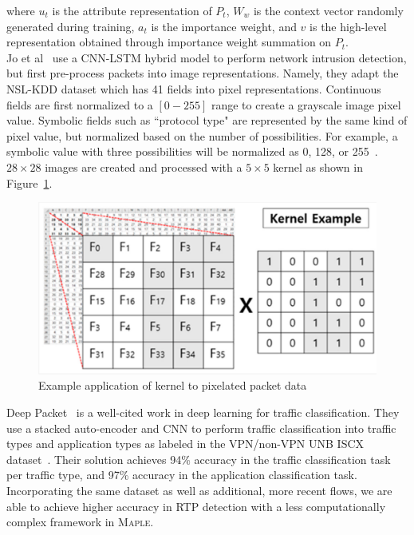 where $u_t$ is the attribute representation of $P_t$, $W_w$ is the context vector randomly generated during training, $a_t$ is the importance weight, and $v$ is the high-level representation obtained through importance weight summation on $P_t$. \\

Jo et al~\cite{jo2020packet} use a CNN-LSTM hybrid model to perform network intrusion detection, but first pre-process packets into image representations. Namely, they adapt the NSL-KDD dataset which has 41 fields into pixel representations. Continuous fields are first normalized to a $[0-255]$ range to create a grayscale image pixel value. Symbolic fields such as ``protocol type" are represented by the same kind of pixel value, but normalized based on the number of possibilities. For example, a symbolic value with three possibilities will be normalized as 0, 128, or 255~\cite{jo2020packet}. $28 \times 28$ images are created and processed with a $5 \times 5$ kernel as shown in Figure~\ref{fig:kernel}.

\begin{figure} [h!]
\includegraphics[width=\linewidth]{chapters/5/img/kernel.png}
\caption{Example application of kernel to pixelated packet data~\cite{jo2020packet}}
\label{fig:kernel}
\end{figure}

Deep Packet~\cite{lotfollahi2020deep} is a well-cited work in deep learning for traffic classification. They use a stacked auto-encoder and CNN to perform traffic classification into traffic types and application types as labeled in the VPN/non-VPN UNB ISCX dataset~\cite{vpn-dataset}. Their solution achieves 94\% accuracy in the traffic classification task per traffic type, and 97\% accuracy in the application classification task. Incorporating the same dataset as well as additional, more recent flows, we are able to achieve higher accuracy in RTP detection with a less computationally complex framework in \textsc{Maple}.
